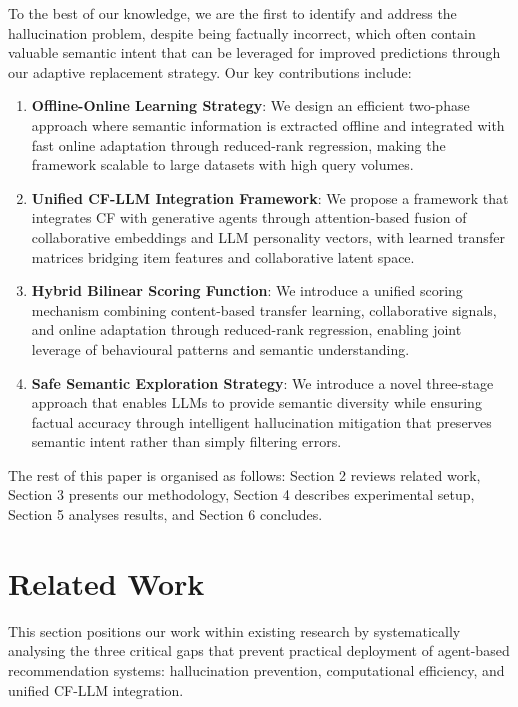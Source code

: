 \documentclass[acmsmall]{acmart}
\begin{document}
To the best of our knowledge, we are the first to identify and address the hallucination problem, despite being factually incorrect, which often contain valuable semantic intent that can be leveraged for improved predictions through our adaptive replacement strategy. Our key contributions include:

\begin{enumerate}
\item \textbf{Offline-Online Learning Strategy}: We design an efficient two-phase approach where semantic information is extracted offline and integrated with fast online adaptation through reduced-rank regression, making the framework scalable to large datasets with high query volumes.
\item \textbf{Unified CF-LLM Integration Framework}: We propose a framework that integrates CF with generative agents through attention-based fusion of collaborative embeddings and LLM personality vectors, with learned transfer matrices bridging item features and collaborative latent space.
\item \textbf{Hybrid Bilinear Scoring Function}: We introduce a unified scoring mechanism combining content-based transfer learning, collaborative signals, and online adaptation through reduced-rank regression, enabling joint leverage of behavioural patterns and semantic understanding.
\item \textbf{Safe Semantic Exploration Strategy}: We introduce a novel three-stage approach that enables LLMs to provide semantic diversity while ensuring factual accuracy through intelligent hallucination mitigation that preserves semantic intent rather than simply filtering errors.

\end{enumerate}


The rest of this paper is organised as follows: Section 2 reviews related work, Section 3 presents our methodology, Section 4 describes experimental setup, Section 5 analyses results, and Section 6 concludes.


\section{Related Work}
This section positions our work within existing research by systematically analysing the three critical gaps that prevent practical deployment of agent-based recommendation systems: hallucination prevention, computational efficiency, and unified CF-LLM integration.
\end{document}
